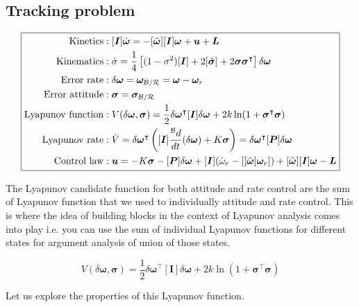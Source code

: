 \documentclass{article}
\begin{document}
\subsection{Tracking problem}
\begin{equation*}
  \boxed{
  \begin{split}
    \textnormal{Kinetics}&:[\bm{I}]\dot{\bm{\omega}}=-[\tilde{\bm{\omega}}][\bm{I}]\bm{\omega}+\bm{u}+\bm{L}\\
    \textnormal{Kinematics}&:\dot{\sigma} = \frac{1}{4}\left[(1-\sigma^{2})[\bm{I}]+2[\tilde{\bm{\sigma}}]+2\bm{\sigma}\bm{\sigma}^{\intercal}\right]\delta\bm{\omega}\\
    \textnormal{Error rate}&:\delta\bm{\omega}=\bm{\omega}_{\mathcal{B}/\mathcal{R}}=\bm{\omega}-\bm{\omega}_{r}\\
    \textnormal{Error attitude}&:\bm{\sigma}=\bm{\sigma}_{\mathcal{B}/\mathcal{R}}\\
    \textnormal{Lyapunov function}&:V(\delta{\bm{\omega}},\bm{\sigma})=\frac{1}{2}\delta\bm{\omega}^{\intercal}[\bm{I}]\delta\bm{\omega}+2k\ln(1+\bm{\sigma}^{\intercal}\bm{\sigma})\\
    \textnormal{Lyapunov rate}&:\dot{V}=\delta\bm{\omega}^{\intercal}\left([\bm{I}]\frac{{}^{\mathcal{B}}d}{dt}(\delta\bm{\omega})+K\bm{\sigma}\right)=\delta\bm{\omega}^{\intercal}[\bm{P}]\delta\bm{\omega}\\
    \textnormal{Control law}&:\bm{u}=-K\bm{\sigma}-[\bm{P}]\delta\bm{\omega}+[\bm{I}](\dot{\omega}_{r}-[[\tilde{\bm{\omega}}]\bm{\omega}_{r}])+[\tilde{\bm{\omega}}][\bm{I}]\bm{\omega}-\bm{L}\\
  \end{split}
  }
\end{equation*}

The Lyapunov candidate function for both attitude and rate control are the sum of Lyapunov function that we used to individually attitude and rate control. This is where the idea of building blocks in the context of Lyapunov analysis comes into play i.e. you can use the sum of individual Lyapunov functions for different states for argument analysis of union of those states.

\begin{equation}
  \label{eqn_rate_attitude_lyapunov}
  V(\delta{\bm{\omega}},\bm{\sigma})=\frac{1}{2}\delta\bm{\omega}^{\intercal}[\bm{I}]\delta\bm{\omega}+2k\ln(1+\bm{\sigma}^{\intercal}\bm{\sigma})
\end{equation}

Let us explore the properties of this Lyapunov function.
\end{document}
